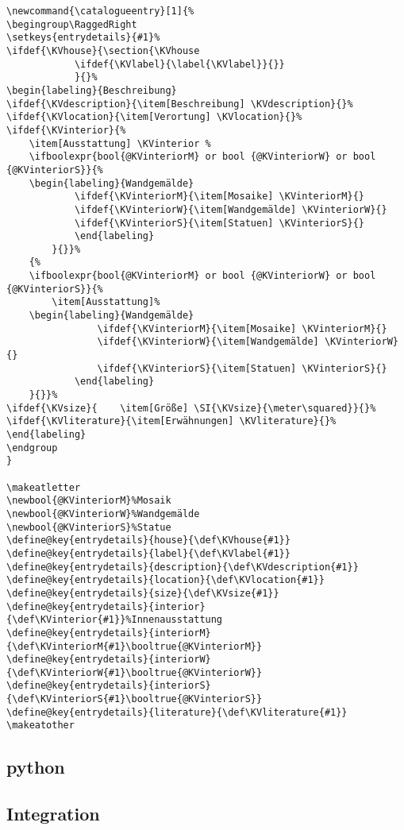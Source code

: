 \documentclass[ngerman]{dtk}
\makeatletter
\newcommand{\catalogueentry}[1]{%
\begingroup\RaggedRight 
\setkeys{entrydetails}{#1}%
\ifdef{\KVhouse}{\section{\KVhouse
			\ifdef{\KVlabel}{\label{\KVlabel}}{}}
			}{}%
\begin{labeling}{Beschreibung}
\ifdef{\KVdescription}{\item[Beschreibung] \KVdescription}{}%
\ifdef{\KVlocation}{\item[Verortung] \KVlocation}{}%
\ifdef{\KVinterior}{%
	\item[Ausstattung] \KVinterior %
	\ifboolexpr{bool{@KVinteriorM} or bool {@KVinteriorW} or bool {@KVinteriorS}}{%
	\begin{labeling}{Wandgemälde}
			\ifdef{\KVinteriorM}{\item[Mosaike] \KVinteriorM}{}
			\ifdef{\KVinteriorW}{\item[Wandgemälde] \KVinteriorW}{}
			\ifdef{\KVinteriorS}{\item[Statuen] \KVinteriorS}{}
			\end{labeling}
		}{}}%
	{%
	\ifboolexpr{bool{@KVinteriorM} or bool {@KVinteriorW} or bool {@KVinteriorS}}{%
		\item[Ausstattung]%
	\begin{labeling}{Wandgemälde}	
				\ifdef{\KVinteriorM}{\item[Mosaike] \KVinteriorM}{}
				\ifdef{\KVinteriorW}{\item[Wandgemälde] \KVinteriorW}{}
				\ifdef{\KVinteriorS}{\item[Statuen] \KVinteriorS}{}
			\end{labeling}
	}{}}%
\ifdef{\KVsize}{	\item[Größe] \SI{\KVsize}{\meter\squared}}{}%
\ifdef{\KVliterature}{\item[Erwähnungen] \KVliterature}{}%
\end{labeling}
\endgroup
}
\makeatother
\begin{document}
\begin{lstlisting}[style=number]
\newcommand{\catalogueentry}[1]{%
\begingroup\RaggedRight 
\setkeys{entrydetails}{#1}%
\ifdef{\KVhouse}{\section{\KVhouse
			\ifdef{\KVlabel}{\label{\KVlabel}}{}}
			}{}%
\begin{labeling}{Beschreibung}
\ifdef{\KVdescription}{\item[Beschreibung] \KVdescription}{}%
\ifdef{\KVlocation}{\item[Verortung] \KVlocation}{}%
\ifdef{\KVinterior}{%
	\item[Ausstattung] \KVinterior %
	\ifboolexpr{bool{@KVinteriorM} or bool {@KVinteriorW} or bool {@KVinteriorS}}{%
	\begin{labeling}{Wandgemälde}
			\ifdef{\KVinteriorM}{\item[Mosaike] \KVinteriorM}{}
			\ifdef{\KVinteriorW}{\item[Wandgemälde] \KVinteriorW}{}
			\ifdef{\KVinteriorS}{\item[Statuen] \KVinteriorS}{}
			\end{labeling}
		}{}}%
	{%
	\ifboolexpr{bool{@KVinteriorM} or bool {@KVinteriorW} or bool {@KVinteriorS}}{%
		\item[Ausstattung]%
	\begin{labeling}{Wandgemälde}	
				\ifdef{\KVinteriorM}{\item[Mosaike] \KVinteriorM}{}
				\ifdef{\KVinteriorW}{\item[Wandgemälde] \KVinteriorW}{}
				\ifdef{\KVinteriorS}{\item[Statuen] \KVinteriorS}{}
			\end{labeling}
	}{}}%
\ifdef{\KVsize}{	\item[Größe] \SI{\KVsize}{\meter\squared}}{}%
\ifdef{\KVliterature}{\item[Erwähnungen] \KVliterature}{}%		
\end{labeling}
\endgroup
}

\makeatletter
\newbool{@KVinteriorM}%Mosaik
\newbool{@KVinteriorW}%Wandgemälde
\newbool{@KVinteriorS}%Statue
\define@key{entrydetails}{house}{\def\KVhouse{#1}}
\define@key{entrydetails}{label}{\def\KVlabel{#1}}
\define@key{entrydetails}{description}{\def\KVdescription{#1}}
\define@key{entrydetails}{location}{\def\KVlocation{#1}}
\define@key{entrydetails}{size}{\def\KVsize{#1}}
\define@key{entrydetails}{interior}{\def\KVinterior{#1}}%Innenausstattung
\define@key{entrydetails}{interiorM}{\def\KVinteriorM{#1}\booltrue{@KVinteriorM}}
\define@key{entrydetails}{interiorW}{\def\KVinteriorW{#1}\booltrue{@KVinteriorW}}
\define@key{entrydetails}{interiorS}{\def\KVinteriorS{#1}\booltrue{@KVinteriorS}}
\define@key{entrydetails}{literature}{\def\KVliterature{#1}}
\makeatother
\end{lstlisting}



\subsection{python}

\subsection{Integration}
\end{document}
